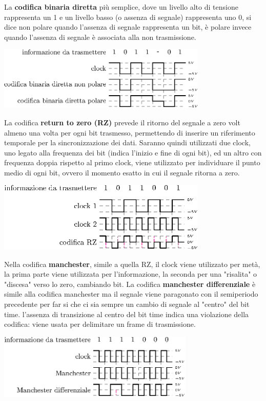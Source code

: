 \documentclass[10pt, letterpaper]{report}
\begin{document}
La \textbf{codifica binaria diretta} più semplice, dove un livello alto di tensione rappresenta un 1 e un livello basso (o assenza di segnale) rappresenta uno 0, si dice non polare quando l'assenza di segnale rappresenta un bit, è polare invece quando l'assenza di segnale è associata alla non trasmissione.
\begin{center}
    \includegraphics[width=0.75\textwidth ]{images/codBinPol.eps}
\end{center}
La codifica \textbf{return to zero (RZ)} prevede il ritorno del segnale a zero volt almeno una volta per ogni bit trasmesso, permettendo di inserire un riferimento temporale per la sincronizzazione dei dati. Saranno quindi utilizzati due clock, uno legato alla frequenza dei bit (indica l'inizio e fine di ogni bit), ed un altro con 
frequenza doppia rispetto al  primo clock, viene utilizzato per individuare il punto medio di ogni bit, ovvero il momento esatto in cui il segnale ritorna a zero.
\begin{center}
    \includegraphics[width=0.75\textwidth ]{images/RZ.eps}
\end{center}
Nella codifica \textbf{manchester}, simile a quella RZ, il clock viene utilizzato per metà, la prima parte viene utilizzata per l'informazione, la seconda per una "risalita" o "discesa" verso lo zero, cambiando bit.
\acc La codifica \textbf{manchester differenziale} è simile alla codifica manchester ma il segnale viene paragonato con il semiperiodo precedente per far si che ci sia sempre un cambio di segnale al "centro" del bit time.
l'assenza di transizione al centro del bit time indica una violazione
della codifica: viene usata per delimitare un frame di trasmissione.
\begin{center}
    \includegraphics[width=0.7\textwidth ]{images/manchester.eps}
\end{center}
\end{document}
